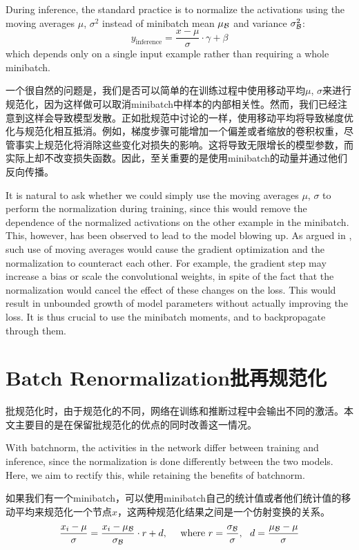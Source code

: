 During inference, the standard practice is to normalize the activations using the moving averages $\mu$, $\sigma^2$ instead of minibatch mean $\mu_{\mathcal{B}}$ and variance $\sigma_{\mathcal{B}}^2$:
$$
y_\text{inference} = \frac{x-\mu}{\sigma}\cdot \gamma + \beta
$$
which depends only on a single input example rather than requiring a whole minibatch.

一个很自然的问题是，我们是否可以简单的在训练过程中使用移动平均$\mu$, $\sigma$来进行规范化，因为这样做可以取消minibatch中样本的内部相关性。然而，我们已经注意到这样会导致模型发散。正如批规范\cite{batchnorm}中讨论的一样，使用移动平均将导致梯度优化与规范化相互抵消。例如，梯度步骤可能增加一个偏差或者缩放的卷积权重，尽管事实上规范化将消除这些变化对损失的影响。这将导致无限增长的模型参数，而实际上却不改变损失函数。因此，至关重要的是使用minibatch的动量并通过他们反向传播。

It is natural to ask whether we could simply use the moving averages $\mu$, $\sigma$ to perform the normalization during training, since this would remove the dependence of the normalized activations on the other example in the minibatch. This, however, has been observed to lead to the model blowing up. As argued in \cite{batchnorm}, such use of moving averages would cause the gradient optimization and the normalization to counteract each other. For example, the gradient step may increase a bias or scale the convolutional weights, in spite of the fact that the normalization would cancel the effect of these changes on the loss. This would result in unbounded growth of model parameters without actually improving the loss. It is thus crucial to use the minibatch moments, and to backpropagate through them.

\section{Batch Renormalization批再规范化}
批规范化时，由于规范化的不同，网络在训练和推断过程中会输出不同的激活。本文主要目的是在保留批规范化的优点的同时改善这一情况。

With batchnorm, the activities in the network differ between training and inference, since the normalization is done differently between the two models. Here, we aim to rectify this, while retaining  the benefits of batchnorm.

如果我们有一个minibatch，可以使用minibatch自己的统计值或者他们统计值的移动平均来规范化一个节点$x$，这两种规范化结果之间是一个仿射变换的关系。
$$
\frac{x_i-\mu}{\sigma} = \frac{x_i-\mu_{\mathcal{B}}}{\sigma_{\mathcal{B}}} \cdot r + d,\ \ \ \ \text{where $ r = \frac{\sigma_{\mathcal{B}}}{\sigma}, \ \  d = \frac{\mu_{\mathcal{B}}-\mu}{\sigma}$}
$$

